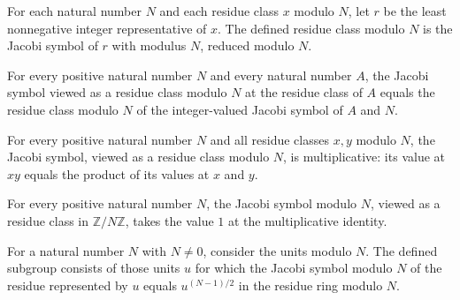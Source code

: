 \begin{definition}
\label{Randomized.jacobiSymZMod}
\leanok
For each natural number $N$ and each residue class $x$ modulo $N$, let $r$ be the least
nonnegative integer representative of $x$. The defined residue class modulo $N$ is the
Jacobi symbol of $r$ with modulus $N$, reduced modulo $N$.
\end{definition}

\begin{theorem}
\label{Randomized.jacobiSymZMod_natCast}
\leanok
{}
For every positive natural number $N$ and every natural number $A$, the Jacobi symbol
viewed as a residue class modulo $N$ at the residue class of $A$ equals the residue
class modulo $N$ of the integer-valued Jacobi symbol of $A$ and $N$.
\end{theorem}

\begin{theorem}
\label{Randomized.jacobiSymZMod_mul}
\leanok
{}
For every positive natural number $N$ and all residue classes $x,y$ modulo $N$, the
Jacobi symbol, viewed as a residue class modulo $N$, is multiplicative: its value at
$xy$ equals the product of its values at $x$ and $y$.
\end{theorem}

\begin{theorem}
\label{Randomized.jacobiSymZMod_one}
\leanok
{}
For every positive natural number $N$, the Jacobi symbol modulo $N$, viewed as a residue
class in $\mathbb{Z}/N\mathbb{Z}$, takes the value $1$ at the multiplicative identity.
\end{theorem}

\begin{definition}
\label{Randomized.eulerLiarSubgroup}
\leanok
{}
For a natural number $N$ with $N\ne 0$, consider the units modulo $N$. The defined
subgroup consists of those units $u$ for which the Jacobi symbol modulo $N$ of the
residue represented by $u$ equals $u^{(N-1)/2}$ in the residue ring modulo $N$.
\end{definition}

